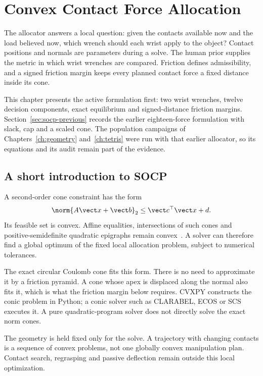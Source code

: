 \chapter{Convex Contact Force Allocation}
\label{ch:socp}

The allocator answers a local question: given the contacts available now and the load believed now, which wrench should each wrist apply to the object? Contact positions and normals are parameters during a solve. The human prior supplies the metric in which wrist wrenches are compared. Friction defines admissibility, and a signed friction margin keeps every planned contact force a fixed distance inside its cone.

This chapter presents the active formulation first: two wrist wrenches, twelve decision components, exact equilibrium and signed-distance friction margins. Section~\ref{sec:socp-previous} records the earlier eighteen-force formulation with slack, cap and a scaled cone. The population campaigns of Chapters~\ref{ch:geometry} and~\ref{ch:tetris} were run with that earlier allocator, so its equations and its audit remain part of the evidence.

\section{A short introduction to SOCP}

A second-order cone constraint has the form
\begin{equation}
\norm{A\vect x+\vect b}_2\leq\vect c^\top\vect x+d.
\end{equation}
Its feasible set is convex. Affine equalities, intersections of such cones and positive-semidefinite quadratic epigraphs remain convex~\cite{boyd2004}. A solver can therefore find a global optimum of the fixed local allocation problem, subject to numerical tolerances.

The exact circular Coulomb cone fits this form. There is no need to approximate it by a friction pyramid. A cone whose apex is displaced along the normal also fits it, which is what the friction margin below requires. CVXPY constructs the conic problem in Python; a conic solver such as CLARABEL, ECOS or SCS executes it. A pure quadratic-program solver does not directly solve the exact norm cones.

The geometry is held fixed only for the solve. A trajectory with changing contacts is a sequence of convex problems, not one globally convex manipulation plan. Contact search, regrasping and passive deflection remain outside this local optimization.

